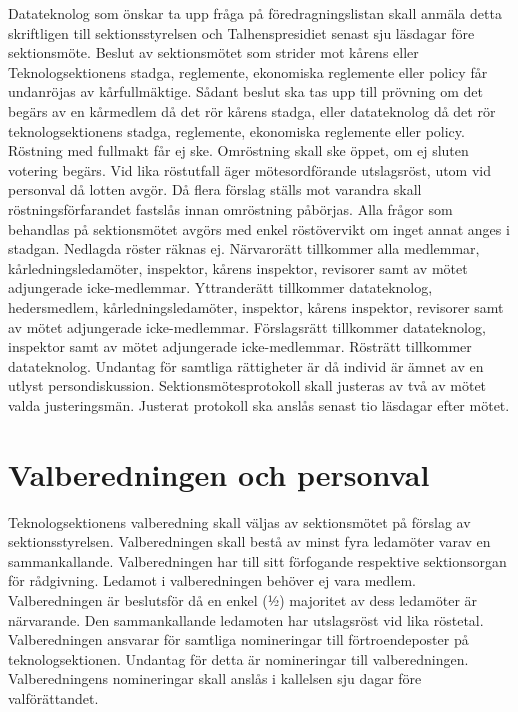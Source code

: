\documentclass[a4paper]{dtek}
\begin{document}
\para[Motion] Datateknolog som önskar ta upp fråga på föredragningslistan skall anmäla detta skriftligen till sektionsstyrelsen och Talhenspresidiet senast sju läsdagar före sektionsmöte.
\para[Överklagande] Beslut av sektionsmötet som strider mot kårens eller Teknologsektionens stadga, reglemente, ekonomiska reglemente eller policy får undanröjas av kårfullmäktige.
\stycke Sådant beslut ska tas upp till prövning om det begärs av en kårmedlem då det rör kårens stadga, eller datateknolog då det rör teknologsektionens stadga, reglemente, ekonomiska reglemente eller policy.
\para[Omröstning] Röstning med fullmakt får ej ske.
\para Omröstning skall ske öppet, om ej sluten votering begärs.
\para Vid lika röstutfall äger mötesordförande utslagsröst, utom vid personval då lotten avgör.
\para Då flera förslag ställs mot varandra skall röstningsförfarandet fastslås innan omröstning påbörjas.
\para Alla frågor som behandlas på sektionsmötet avgörs med enkel röstövervikt om inget annat anges i stadgan. Nedlagda röster räknas ej.
\para[Rättigheter] Närvarorätt tillkommer alla medlemmar, kårledningsledamöter, inspektor, kårens inspektor, revisorer samt av mötet adjungerade icke-medlemmar.
\para Yttranderätt tillkommer datateknolog, hedersmedlem, kårledningsledamöter, inspektor, kårens inspektor, revisorer samt av mötet adjungerade icke-medlemmar.
\para Förslagsrätt tillkommer datateknolog, inspektor samt av mötet adjungerade icke-medlemmar.
\para Rösträtt tillkommer datateknolog.
\para[Persondiskussion] Undantag för samtliga rättigheter är då individ är ämnet av en utlyst persondiskussion. 
\para[Protokoll] Sektionsmötesprotokoll skall justeras av två av mötet valda justeringsmän. Justerat protokoll ska anslås senast tio läsdagar efter mötet.

\section{Valberedningen och personval}
\para[Sammansättning] Teknologsektionens valberedning skall väljas av sektionsmötet på förslag av sektionsstyrelsen.
\para Valberedningen skall bestå av minst fyra ledamöter varav en sammankallande.
\para Valberedningen har till sitt förfogande respektive sektionsorgan för rådgivning.
\para Ledamot i valberedningen behöver ej vara medlem.
\para[Beslutsförhet] Valberedningen är beslutsför då en enkel (1⁄2) majoritet av dess ledamöter är närvarande.
\para Den sammankallande ledamoten har utslagsröst vid lika röstetal.
\para[Åligganden] Valberedningen ansvarar för samtliga nomineringar till förtroendeposter på teknologsektionen.
\stycke Undantag för detta är nomineringar till valberedningen.
\para Valberedningens nomineringar skall anslås i kallelsen sju dagar före valförättandet.
\end{document}
